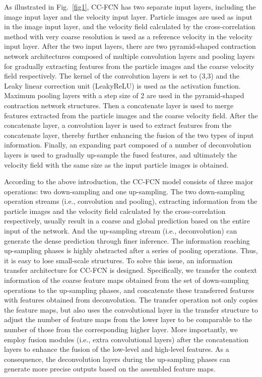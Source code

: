 \documentclass[%
 aip,
 amsmath,amssymb,
 reprint,%
]{revtex4-1}
\begin{document}
As illustrated in Fig.~\ref{fig1}, CC-FCN has two separate input layers, including the image input layer and the velocity input layer. 
Particle images are used as input in the image input layer, and the velocity field calculated by the cross-correlation method with very coarse resolution is used as a reference velocity in the velocity input layer. 
After the two input layers, there are two pyramid-shaped contraction network architectures composed of multiple convolution layers and pooling layers for gradually extracting features from the particle images and the coarse velocity field respectively. 
The kernel of the convolution layers is set to (3,3) and the Leaky linear correction unit (LeakyReLU)\citep{xu2015empirical} is used as the activation function. 
Maximum pooling layers with a step size of 2 are used in the pyramid-shaped contraction network structures. 
Then a concatenate layer is used to merge features extracted from the particle images and the coarse velocity field. 
After the concatenate layer, a convolution layer is used to extract features from the concatenate layer, thereby further enhancing the fusion of the two types of input information.
Finally, an expanding part composed of a number of deconvolution layers is used to gradually up-sample the fused features, and ultimately the velocity field with the same size as the input particle images is obtained.

According to the above introduction, the CC-FCN model consists of three major operations: two down-sampling and one up-sampling. 
The two down-sampling operation streams (i.e., convolution and pooling), extracting information from the particle images and the velocity field calculated by the cross-correlation respectively, usually result in a coarse and global prediction based on the entire input of the network.
And the up-sampling stream (i.e., deconvolution) can generate the dense prediction through finer inference. 
The information reaching up-sampling phases is highly abstracted after a series of pooling operations. Thus, it is easy to lose small-scale structures.
To solve this issue, an information transfer architecture for CC-FCN is designed.
Specifically, we transfer the context information of the coarse feature maps obtained from the set of down-sampling operations to the up-sampling phases, and concatenate these transferred features with features obtained from deconvolution.
The transfer operation not only copies the feature maps, but also uses the convolutional layer in the transfer structure to adjust the number of feature maps from the lower layer to be comparable to the number of those from the corresponding higher layer.
More importantly, we employ fusion modules (i.e., extra convolutional layers) after the concatenation layers to enhance the fusion of the low-level and high-level features. 
As a consequence, the deconvolution layers during the up-sampling phases can generate more precise outputs based on the assembled feature maps.
\end{document}
